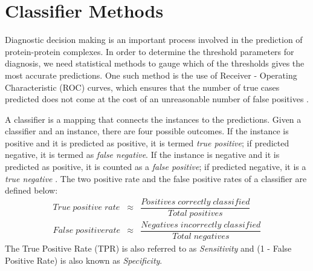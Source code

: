 \section{Classifier Methods}
Diagnostic decision making is an important process involved in the prediction of protein-protein complexes. In order to determine the threshold parameters for diagnosis, we need statistical methods to gauge which of the thresholds gives the most accurate predictions. One such method is the use of Receiver - Operating Characteristic (ROC) curves, which ensures that the number of true cases predicted does not come at the cost of an unreasonable number of false positives \citep{Swets2000}.
\par
A classifier is a mapping that connects the instances to the predictions. Given a classifier and an instance, there are four possible outcomes. If the instance is positive and it is predicted as positive, it is termed \textit{true positive}; if predicted negative, it is termed as \textit{false negative}. If the instance is negative and it is predicted as positive, it is counted as a \textit{false positive}; if predicted negative, it is a \textit{true negative} \citep{Fawcett2004}. The two positive rate and the false positive rates of a classifier are defined below: \begin{eqnarray}
True\;positive\;rate &\approx& \dfrac{Positives\;correctly\;classified}{Total\;positives} \\[12pt]
False\;positive rate &\approx& \dfrac{Negatives\;incorrectly\;classified}{Total\;negatives}
\end{eqnarray}
The True Positive Rate (TPR) is also referred to as \textit{Sensitivity} and (1 - False Positive Rate) is also known as \textit{Specificity}.

